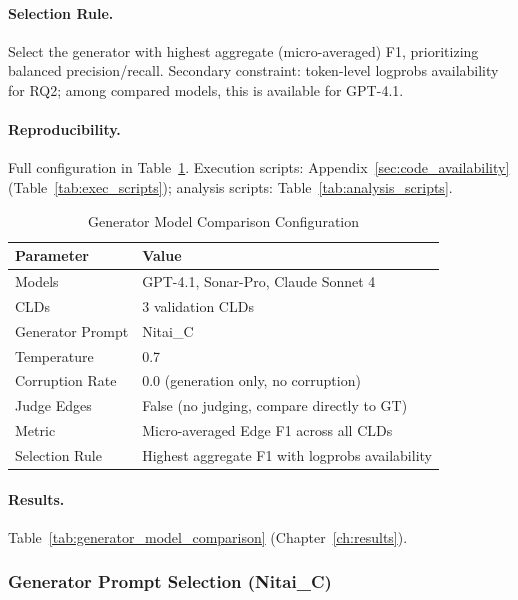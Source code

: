\paragraph{Selection Rule.}
Select the generator with highest aggregate (micro-averaged) F1, prioritizing balanced precision/recall. Secondary constraint: token-level logprobs availability for RQ2; among compared models, this is available for GPT-4.1.

\paragraph{Reproducibility.}
Full configuration in Table~\ref{tab:generator_comparison_config}. Execution scripts: Appendix~\ref{sec:code_availability} (Table~\ref{tab:exec_scripts}); analysis scripts: Table~\ref{tab:analysis_scripts}.

\begin{table}[H]
\centering
\caption{Generator Model Comparison Configuration}
\label{tab:generator_comparison_config}
\footnotesize
\begin{tabular}{@{}ll@{}}
\toprule
\textbf{Parameter} & \textbf{Value} \\
\midrule
Models & GPT-4.1, Sonar-Pro, Claude Sonnet 4 \\
CLDs & 3 validation CLDs \\
Generator Prompt & Nitai\_C \\
Temperature & 0.7 \\
Corruption Rate & 0.0 (generation only, no corruption) \\
Judge Edges & False (no judging, compare directly to GT) \\
\midrule
Metric & Micro-averaged Edge F1 across all CLDs \\
Selection Rule & Highest aggregate F1 with logprobs availability \\
\bottomrule
\end{tabular}
\end{table}

\paragraph{Results.}
Table~\ref{tab:generator_model_comparison} (Chapter~\ref{ch:results}).

\subsubsection{Generator Prompt Selection (Nitai\_C)}
\label{sec:generator_prompt_selection}

